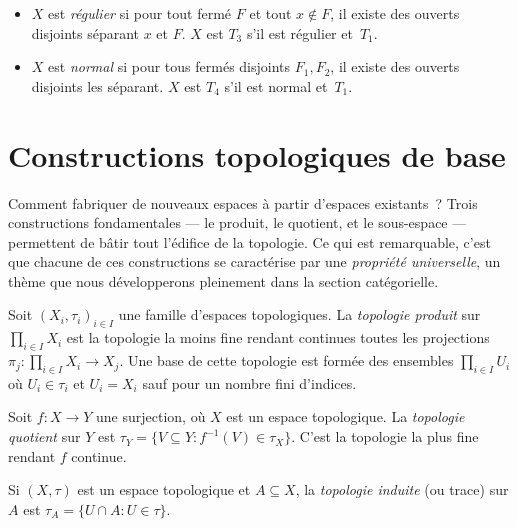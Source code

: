 \begin{definition}
\begin{itemize}
  \item $X$ est \emph{r\'egulier} si pour tout ferm\'e $F$ et tout $x \notin F$, il existe
    des ouverts disjoints s\'eparant $x$ et $F$. $X$ est \emph{$T_3$} s'il est r\'egulier
    et~$T_1$.
  \item $X$ est \emph{normal} si pour tous ferm\'es disjoints $F_1, F_2$, il existe des
    ouverts disjoints les s\'eparant. $X$ est \emph{$T_4$} s'il est normal et~$T_1$.
\end{itemize}
\end{definition}

\section{Constructions topologiques de base}

Comment fabriquer de nouveaux espaces \`a partir d'espaces existants~? Trois
constructions fondamentales --- le produit, le quotient, et le sous-espace
--- permettent de b\^atir tout l'\'edifice de la topologie. Ce qui est
remarquable, c'est que chacune de ces constructions se caract\'erise par une
\emph{propri\'et\'e universelle}, un th\`eme que nous d\'evelopperons pleinement
dans la section cat\'egorielle.

\begin{definition}
Soit $(X_i,\tau_i)_{i\in I}$ une famille d'espaces topologiques. La \emph{topologie
produit} sur $\prod_{i\in I} X_i$ est la topologie la moins fine rendant continues
toutes les projections $\pi_j\colon \prod_{i\in I} X_i \to X_j$.
Une base de cette topologie est form\'ee des ensembles
$\prod_{i\in I} U_i$ o\`u $U_i \in \tau_i$ et $U_i = X_i$ sauf pour un nombre fini
d'indices.
\end{definition}

\begin{definition}
Soit $f\colon X \to Y$ une surjection, o\`u $X$ est un espace topologique. La
\emph{topologie quotient} sur $Y$ est
$\tau_Y = \{V \subseteq Y : f^{-1}(V) \in \tau_X\}$.
C'est la topologie la plus fine rendant $f$ continue.
\end{definition}

\begin{definition}
Si $(X,\tau)$ est un espace topologique et $A \subseteq X$, la \emph{topologie induite}
(ou trace) sur $A$ est $\tau_A = \{U \cap A : U \in \tau\}$.
\end{definition}

